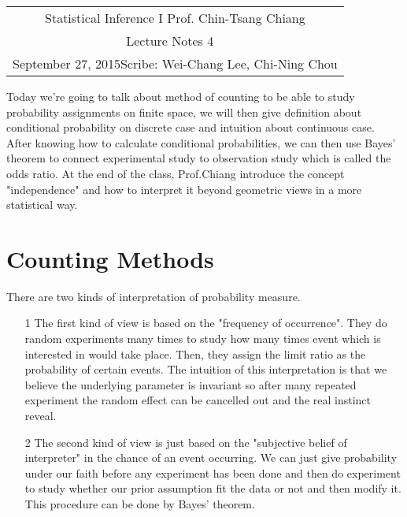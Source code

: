 \documentclass[11pt]{article}
\newcommand{\scribe}{Wei-Chang Lee, Chi-Ning Chou}
\newcommand{\lecnum}{4}
\newcommand{\lecdate}{September 27, 2015}
\begin{document}
	
	\begin{center}
		\renewcommand{\arraystretch}{2}
		\begin{bfseries}
			\begin{tabular}{|c|}
				\hline
				Statistical Inference I \hfill Prof. Chin-Tsang Chiang\\
				\hspace{15em} {\large Lecture Notes \lecnum} \hspace{15em}\ \\
				\lecdate \hfill Scribe: \scribe\\
				\hline
			\end{tabular}
			\renewcommand{\arraystretch}{1}
		\end{bfseries}
	\end{center}
	
Today we're going to talk about method of counting to be able to study probability assignments on finite space, we will then give definition about conditional probability on discrete case and intuition about continuous case. After knowing how to calculate conditional probabilities, we can then use Bayes' theorem to connect experimental study to observation study which is called the odds ratio. At the end of the class, Prof.Chiang introduce the concept "independence" and how to interpret it beyond geometric views in a more statistical way.
\section{Counting Methods}
  There are two kinds of interpretation of probability measure. 
\begin{enumerate}
\item[1]
  The first kind of view is based on the "frequency of occurrence". They do random experiments many times to study  how many times event which is interested in would take place. Then, they assign the limit ratio  as the probability of certain events. The intuition of this interpretation is that we believe the underlying parameter is invariant so after many repeated experiment the random effect can be cancelled out and the real instinct reveal. 
\item[2]
  The second kind of view is just based on the "subjective belief of interpreter" in the chance of an event occurring.  We can just give probability under our faith before any experiment has been done and then do experiment to study whether our prior assumption fit the data or not and then modify it. This procedure can be done by Bayes' theorem. 
\end{enumerate}
\end{document}
